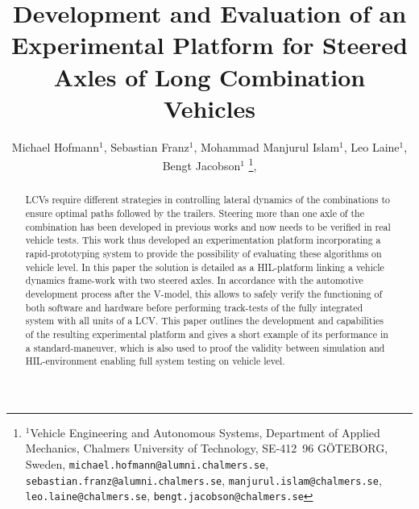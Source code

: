 \documentclass[letterpaper, 10pt, conference]{IEEEconf}      %
\title{\LARGE \bf
Development and Evaluation of an Experimental Platform for Steered Axles of Long Combination Vehicles}
\author{Michael Hofmann$^{1}$, Sebastian Franz$^{1}$, Mohammad Manjurul Islam$^{1}$, Leo Laine$^{1}$, Bengt Jacobson$^{1}$%
	\thanks{$^{1}$Vehicle Engineering and Autonomous Systems, Department of Applied Mechanics, Chalmers University of Technology, SE-412~96 G\"OTEBORG, Sweden,
		{\tt\small michael.hofmann@alumni.chalmers.se},
		{\tt\small sebastian.franz@alumni.chalmers.se},
		{\tt\small manjurul.islam@chalmers.se},
		{\tt\small leo.laine@chalmers.se},        
		{\tt\small bengt.jacobson@chalmers.se}
		},
}
\begin{document}

\maketitle
\thispagestyle{empty}
\pagestyle{empty}


\begin{abstract}

	\glspl{LCV} require different strategies in controlling lateral dynamics of the combinations to ensure optimal paths followed by the trailers. Steering more than one axle of the combination has been developed in previous works and now needs to be verified in real vehicle tests. This work thus developed an experimentation platform incorporating a rapid-prototyping system to provide the possibility of evaluating these algorithms on vehicle level. In this paper the solution is detailed as a \gls{HIL}-platform linking a vehicle dynamics frame-work with two steered axles. In accordance with the automotive development process after the V-model, this allows to safely verify the functioning of both software and hardware before performing track-tests of the fully integrated system with all units of a \gls{LCV}. This paper outlines the development and capabilities of the resulting experimental platform and gives a short example of its performance in a standard-maneuver, which is also used to proof the validity between simulation and \gls{HIL}-environment enabling full system testing on vehicle level.

\end{abstract}








%



%





\addtolength{\textheight}{-12cm}   %



\printbibliography
\end{document}
